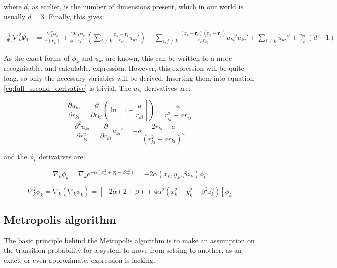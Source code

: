 \documentclass[english, a4paper]{article}
\newcommand{\bm}[1]{\mathbf{#1}}
\begin{document}
where $d$, as earlier, is the number of dimensions present, which in our world is usually $d=3$. Finally, this gives:

\begin{align}
\frac{1}{\Psi_T}\nabla_k^2\Psi_T &= \frac{\nabla_k^2\phi_k}{\phi(\bm{r}_k)} + \frac{2\nabla_k\phi_k}{\phi(\bm{r}_k)}\left(\sum_{i\neq k} \frac{\bm{r}_k - \bm{r}_i}{r_{ki}} u_{ki}' \right) + \sum_{i,j\neq k}\frac{(\bm{r}_k - \bm{r}_i)(\bm{r}_k - \bm{r}_j)}{r_{ki}r_{kj}}u_{ki}'u_{kj}' + \sum_{i\neq k} u_{ki}'' + \frac{u_{ki}'}{r_{ki}} \left(d - 1\right)
\label{eq:full_second_derivative}
\end{align}

As the exact forms of $\phi_k$ and $u_{ki}$ are known, this can be written to a more recognisable, and calculable, expression. However, this expression will be quite long, so only the necessary variables will be derived. Inserting them into equation \ref{eq:full_second_derivative} is trivial. The $u_{ki}$ derivatives are:

\begin{equation}
	\frac{\partial u_{ki}}{\partial r_{ki}} = \frac{\partial}{\partial r_{ki}}\left(\ln\left[1-\frac{a}{r_{ki}}\right]\right) = \frac{a}{r_{ij}^2 - ar_{ij}}
\end{equation}
\begin{equation}
	\frac{\partial^2 u_{ki}}{\partial r_{ki}^2} = \frac{\partial}{\partial r_{ki}} u_{ki}' = -a\frac{2r_{ki} - a}{(r_{ki}^2 - ar_{ki})^2}
\end{equation}

and the $\phi_k$ derivatives are:

\begin{equation}
	\nabla_k\phi_k = \nabla_k e^{-\alpha(x_k^2 + y_k^2 + \beta z_k^2)} = -2\alpha(x_k,y_k,\beta z_k)\phi_k
\end{equation}

\begin{equation}
\nabla_k^2\phi_k = \nabla_k (\nabla_k\phi_k) = \left[-2\alpha(2+\beta) + 4\alpha^2(x_k^2 + y_k^2 + \beta^2 z_k^2)\right]\phi_k
\end{equation}

\subsection{Metropolis algorithm}
The basic principle behind the Metropolis algorithm is to make an assumption on the transition probability for a system to move from setting to another, as
an exact, or even approximate, expression is lacking.
\end{document}
